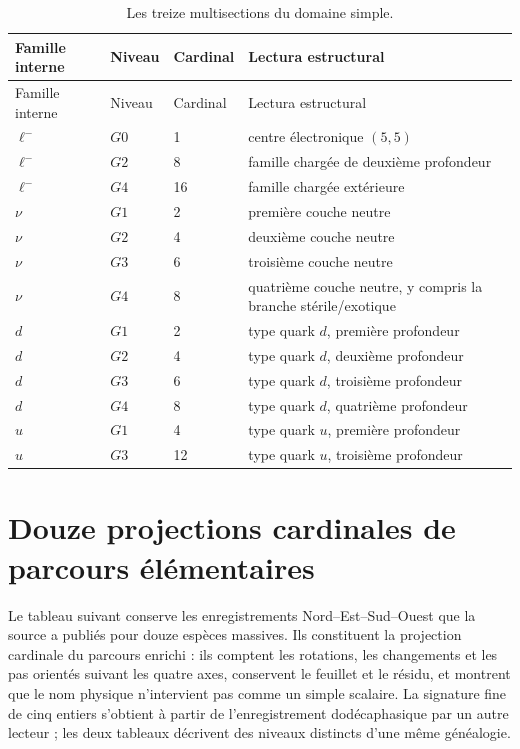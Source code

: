 \begin{longtable}{@{}L{0.22\textwidth}L{0.12\textwidth}L{0.12\textwidth}L{0.46\textwidth}@{}}
\caption{Les treize multisections du domaine simple.}
\label{tab:trece-multisecciones-catalogo-rev6}\\
\toprule
Famille interne & Niveau & Cardinal & Lectura estructural\\
\midrule
\endfirsthead
\toprule
Famille interne & Niveau & Cardinal & Lectura estructural\\
\midrule
\endhead
\(\ell^-\)&\(G0\)&1&centre électronique \((5,5)\)\\
\(\ell^-\)&\(G2\)&8&famille chargée de deuxième profondeur\\
\(\ell^-\)&\(G4\)&16&famille chargée extérieure\\
\(\nu\)&\(G1\)&2&première couche neutre\\
\(\nu\)&\(G2\)&4&deuxième couche neutre\\
\(\nu\)&\(G3\)&6&troisième couche neutre\\
\(\nu\)&\(G4\)&8&quatrième couche neutre, y compris la branche stérile/exotique\\
\(d\)&\(G1\)&2&type quark \(d\), première profondeur\\
\(d\)&\(G2\)&4&type quark \(d\), deuxième profondeur\\
\(d\)&\(G3\)&6&type quark \(d\), troisième profondeur\\
\(d\)&\(G4\)&8&type quark \(d\), quatrième profondeur\\
\(u\)&\(G1\)&4&type quark \(u\), première profondeur\\
\(u\)&\(G3\)&12&type quark \(u\), troisième profondeur\\
\bottomrule
\end{longtable}

\iffalse
\section{Douze projections cardinales de parcours élémentaires}

Le tableau suivant conserve les enregistrements Nord--Est--Sud--Ouest que la
source a publiés pour douze espèces massives. Ils constituent la projection cardinale du
parcours enrichi : ils comptent les rotations, les changements et les pas orientés suivant les quatre
axes, conservent le feuillet et le résidu, et montrent que le nom physique n'intervient pas comme
un simple scalaire. La signature fine de cinq entiers s'obtient à partir de l'enregistrement
dodécaphasique par un autre lecteur ; les deux tableaux décrivent des niveaux distincts d'une
même généalogie.


